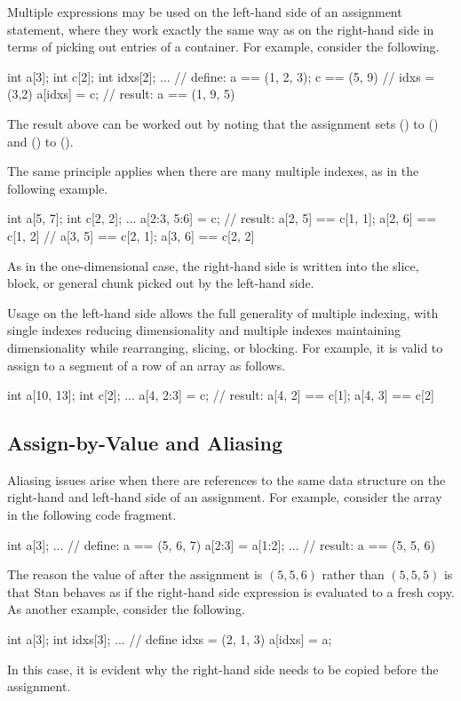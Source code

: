 Multiple expressions may be used on the left-hand side of an
assignment statement, where they work exactly the same way as on the
right-hand side in terms of picking out entries of a container.  
For example, consider the following.
%
\begin{stancode}
int a[3];
int c[2];
int idxs[2];
...             // define: a == (1, 2, 3);  c == (5, 9)
                //         idxs = (3,2)
a[idxs] = c;   // result: a == (1, 9, 5)
\end{stancode}
%
The result above can be worked out by noting that the assignment sets
 () to  () and
 () to  (). 

The same principle applies when there are many multiple indexes, as
in the following example.
%
\begin{stancode}
int a[5, 7];
int c[2, 2];
...
a[2:3, 5:6] = c;  // result: a[2, 5] == c[1, 1];  a[2, 6] == c[1, 2]
                   //         a[3, 5] == c[2, 1];  a[3, 6] == c[2, 2]
\end{stancode}
%
As in the one-dimensional case, the right-hand side is written into
the slice, block, or general chunk picked out by the left-hand side.

Usage on the left-hand side allows the full generality of multiple
indexing, with single indexes reducing dimensionality and multiple
indexes maintaining dimensionality while rearranging, slicing, or
blocking.  For example, it is valid to assign to a segment of a row of
an array as follows.
%
\begin{stancode}
int a[10, 13];
int c[2];
...
a[4, 2:3] = c;  // result:  a[4, 2] == c[1];  a[4, 3] == c[2]
\end{stancode}

\subsection{Assign-by-Value and Aliasing}

Aliasing issues arise when there are references to the same data
structure on the right-hand and left-hand side of an assignment.  For
example, consider the array  in the following code fragment.
%
\begin{stancode}
int a[3];
...                // define: a == (5, 6, 7)
a[2:3] = a[1:2];
...                // result: a == (5, 5, 6) 
\end{stancode}
%
The reason the value of  after the assignment is $(5,5,6)$
rather than $(5,5,5)$ is that Stan behaves as if the right-hand side
expression is evaluated to a fresh copy.   As another example,
consider the following.
%
\begin{stancode}
int a[3];
int idxs[3];
...            // define idxs = (2, 1, 3)
a[idxs] = a;
\end{stancode}
%
In this case, it is evident why the right-hand side needs to be copied
before the assignment.

